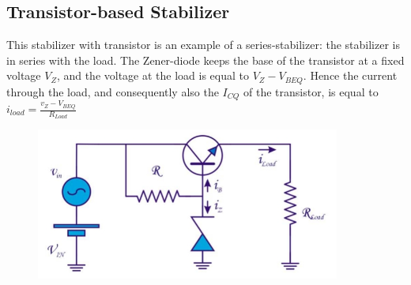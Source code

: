 \subsection{Transistor-based Stabilizer}
\label{sec:transistor_stabilizer}
This stabilizer with transistor is an example of a series-stabilizer: the stabilizer is in series with the load. The Zener-diode keeps the base of the transistor at a fixed voltage $V_Z$, and the voltage at the load is equal to $V_Z - V_{BEQ}$. Hence the current through the load, and consequently also the $I_{CQ}$ of the transistor, is equal to $i_{load} = \frac{v_Z - V_{BEQ}}{R_{Load}}$
\begin{figure}[h!]
	\centering
	\includegraphics[width=10cm]{figures/ch12/stabilizer6.jpg}
	\caption{}
	\label{fig:stabilizer6}
\end{figure}

